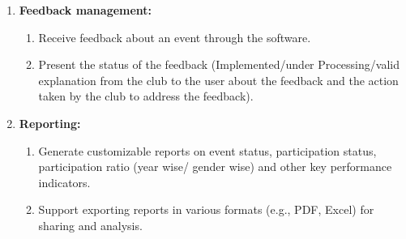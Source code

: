 \begin{enumerate}
\begin{enumerate}
    \end{enumerate}

    \item \textbf{Feedback management:}
    \begin{enumerate}
        \item Receive feedback about an event through the software.
        \item Present the status of the feedback (Implemented/under Processing/valid explanation from the club to the user about the feedback and the action taken by the club to address the feedback).
    \end{enumerate}

    \item \textbf{Reporting: }
    \begin{enumerate}
        \item Generate customizable reports on event status, participation status, participation ratio (year wise/ gender wise) and other key performance indicators.
\item Support exporting reports in various formats (e.g., PDF, Excel) for
sharing and analysis.
    \end{enumerate}


\end{enumerate}

\newpage
